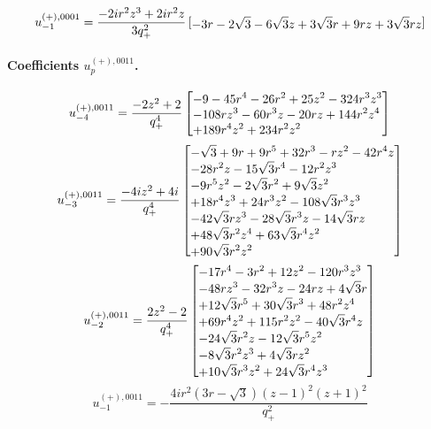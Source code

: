 \documentclass[11pt,a4paper]{article}
\begin{document}
\begin{equation}
u_{-1}^{(+),0001}=\frac{- 2 i r^{2} z^{3} + 2 i r^{2} z}{3 q_{+}^{2}}\left[\vcenter{\hbox{\shortstack[l]{$\displaystyle  - 3 r - 2 \sqrt{3} - 6 \sqrt{3} z + 3 \sqrt{3} r + 9 r z + 3 \sqrt{3} r z$}}}\right]
\label{eq:cat-auxiliary-plus-0001-m1}
\end{equation}
\paragraph{Coefficients $u_p^{(+),0011}$.}
\begin{equation}
u_{-4}^{(+),0011}=\frac{- 2 z^{2} + 2}{q_{+}^{4}}\left[\vcenter{\hbox{\shortstack[l]{$\displaystyle  - 9 - 45 r^{4} - 26 r^{2} + 25 z^{2} - 324 r^{3} z^{3}$\\
$\displaystyle  - 108 r z^{3} - 60 r^{3} z - 20 r z + 144 r^{2} z^{4}$\\
$\displaystyle  + 189 r^{4} z^{2} + 234 r^{2} z^{2}$}}}\right]
\label{eq:cat-auxiliary-plus-0011-m4}
\end{equation}
\begin{equation}
u_{-3}^{(+),0011}=\frac{- 4 i z^{2} + 4 i}{q_{+}^{4}}\left[\vcenter{\hbox{\shortstack[l]{$\displaystyle  - \sqrt{3} + 9 r + 9 r^{5} + 32 r^{3} - r z^{2} - 42 r^{4} z$\\
$\displaystyle  - 28 r^{2} z - 15 \sqrt{3} r^{4} - 12 r^{2} z^{3}$\\
$\displaystyle  - 9 r^{5} z^{2} - 2 \sqrt{3} r^{2} + 9 \sqrt{3} z^{2}$\\
$\displaystyle  + 18 r^{4} z^{3} + 24 r^{3} z^{2} - 108 \sqrt{3} r^{3} z^{3}$\\
$\displaystyle  - 42 \sqrt{3} r z^{3} - 28 \sqrt{3} r^{3} z - 14 \sqrt{3} r z$\\
$\displaystyle  + 48 \sqrt{3} r^{2} z^{4} + 63 \sqrt{3} r^{4} z^{2}$\\
$\displaystyle  + 90 \sqrt{3} r^{2} z^{2}$}}}\right]
\label{eq:cat-auxiliary-plus-0011-m3}
\end{equation}
\begin{equation}
u_{-2}^{(+),0011}=\frac{2 z^{2} - 2}{q_{+}^{4}}\left[\vcenter{\hbox{\shortstack[l]{$\displaystyle  - 17 r^{4} - 3 r^{2} + 12 z^{2} - 120 r^{3} z^{3}$\\
$\displaystyle  - 48 r z^{3} - 32 r^{3} z - 24 r z + 4 \sqrt{3} r$\\
$\displaystyle  + 12 \sqrt{3} r^{5} + 30 \sqrt{3} r^{3} + 48 r^{2} z^{4}$\\
$\displaystyle  + 69 r^{4} z^{2} + 115 r^{2} z^{2} - 40 \sqrt{3} r^{4} z$\\
$\displaystyle  - 24 \sqrt{3} r^{2} z - 12 \sqrt{3} r^{5} z^{2}$\\
$\displaystyle  - 8 \sqrt{3} r^{2} z^{3} + 4 \sqrt{3} r z^{2}$\\
$\displaystyle  + 10 \sqrt{3} r^{3} z^{2} + 24 \sqrt{3} r^{4} z^{3}$}}}\right]
\label{eq:cat-auxiliary-plus-0011-m2}
\end{equation}
\begin{equation}
u_{-1}^{(+),0011}=- \frac{4 i r^{2} \left(3 r - \sqrt{3}\right) \left(z - 1\right)^{2} \left(z + 1\right)^{2}}{q_{+}^{2}}
\label{eq:cat-auxiliary-plus-0011-m1}
\end{equation}
\end{document}
